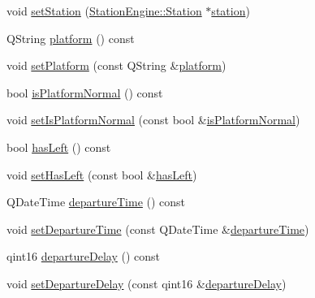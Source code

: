 \begin{DoxyCompactItemize}
\item 
void \mbox{\hyperlink{classQRail_1_1VehicleEngine_1_1Stop_ac7c7af1d3b4b77228eddabe566900633}{set\+Station}} (\mbox{\hyperlink{classQRail_1_1StationEngine_1_1Station}{Station\+Engine\+::\+Station}} $\ast$\mbox{\hyperlink{classQRail_1_1VehicleEngine_1_1Stop_a9a481db5e15c322b04f4b2857d6f210e}{station}})
\item 
Q\+String \mbox{\hyperlink{classQRail_1_1VehicleEngine_1_1Stop_aeac459a67a5a85d5972c7f0256e85a68}{platform}} () const
\item 
void \mbox{\hyperlink{classQRail_1_1VehicleEngine_1_1Stop_a317e658aed106459047de9aa3d0ed46c}{set\+Platform}} (const Q\+String \&\mbox{\hyperlink{classQRail_1_1VehicleEngine_1_1Stop_aeac459a67a5a85d5972c7f0256e85a68}{platform}})
\item 
bool \mbox{\hyperlink{classQRail_1_1VehicleEngine_1_1Stop_a879cdef01cdd3fbe3f735e52c6de23b0}{is\+Platform\+Normal}} () const
\item 
void \mbox{\hyperlink{classQRail_1_1VehicleEngine_1_1Stop_a947512bd45c72143639d21f4374ad1c6}{set\+Is\+Platform\+Normal}} (const bool \&\mbox{\hyperlink{classQRail_1_1VehicleEngine_1_1Stop_a879cdef01cdd3fbe3f735e52c6de23b0}{is\+Platform\+Normal}})
\item 
bool \mbox{\hyperlink{classQRail_1_1VehicleEngine_1_1Stop_a7e349af1d43bbf153a156992df8491c1}{has\+Left}} () const
\item 
void \mbox{\hyperlink{classQRail_1_1VehicleEngine_1_1Stop_aeb6115d7cb0bda10f5f0e0344072e65d}{set\+Has\+Left}} (const bool \&\mbox{\hyperlink{classQRail_1_1VehicleEngine_1_1Stop_a7e349af1d43bbf153a156992df8491c1}{has\+Left}})
\item 
Q\+Date\+Time \mbox{\hyperlink{classQRail_1_1VehicleEngine_1_1Stop_a4ed1b04b9d3d2fe4ac907854cc3e67c2}{departure\+Time}} () const
\item 
void \mbox{\hyperlink{classQRail_1_1VehicleEngine_1_1Stop_aed792855c60317feb444902e791f8cc6}{set\+Departure\+Time}} (const Q\+Date\+Time \&\mbox{\hyperlink{classQRail_1_1VehicleEngine_1_1Stop_a4ed1b04b9d3d2fe4ac907854cc3e67c2}{departure\+Time}})
\item 
qint16 \mbox{\hyperlink{classQRail_1_1VehicleEngine_1_1Stop_a6ef54344f808db033bda9da30d74bac4}{departure\+Delay}} () const
\item 
void \mbox{\hyperlink{classQRail_1_1VehicleEngine_1_1Stop_a212e1fe15c7cd8a2fb2770b97908ed11}{set\+Departure\+Delay}} (const qint16 \&\mbox{\hyperlink{classQRail_1_1VehicleEngine_1_1Stop_a6ef54344f808db033bda9da30d74bac4}{departure\+Delay}})

\end{DoxyCompactItemize}
